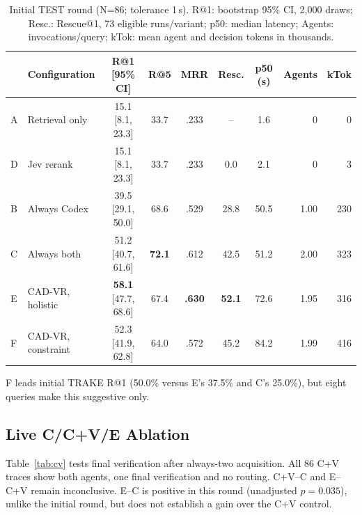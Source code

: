 \documentclass[runningheads]{llncs}
\begin{document}
\begin{table}[t]
\caption{Initial TEST round (N=86; tolerance 1\,s). R@1: bootstrap 95\% CI, 2,000 draws; Resc.: Rescue@1, 73 eligible runs/variant; p50: median latency; Agents: invocations/query; kTok: mean agent and decision tokens in thousands.}
\label{tab:main}
\centering
\setlength{\tabcolsep}{3.1pt}
\footnotesize
\begin{tabular}{@{}llcccccrr@{}}
\toprule
& Configuration & R@1 [95\% CI] & R@5 & MRR & Resc. & p50 (s) & Agents & kTok\\
\midrule
A & Retrieval only & 15.1 [8.1, 23.3] & 33.7 & .233 & -- & 1.6 & 0 & 0\\
D & Jev rerank & 15.1 [8.1, 23.3] & 33.7 & .233 & 0.0 & 2.1 & 0 & 3\\
B & Always Codex & 39.5 [29.1, 50.0] & 68.6 & .529 & 28.8 & 50.5 & 1.00 & 230\\
C & Always both & 51.2 [40.7, 61.6] & \textbf{72.1} & .612 & 42.5 & 51.2 & 2.00 & 323\\
\midrule
E & CAD-VR, holistic & \textbf{58.1} [47.7, 68.6] & 67.4 & \textbf{.630} & \textbf{52.1} & 72.6 & 1.95 & 316\\
F & CAD-VR, constraint & 52.3 [41.9, 62.8] & 64.0 & .572 & 45.2 & 84.2 & 1.99 & 416\\
\bottomrule
\end{tabular}
\end{table}


F leads initial TRAKE R@1 (50.0\% versus E's 37.5\% and C's 25.0\%), but eight queries make this suggestive only.

\subsection{Live C/C+V/E Ablation}
\label{sec:ablation}
Table~\ref{tab:cv} tests final verification after always-two acquisition. All 86 C+V traces show both agents, one final verification and no routing. C+V--C and E--C+V remain inconclusive. E--C is positive in this round (unadjusted $p=0.035$), unlike the initial round, but does not establish a gain over the C+V control.
\end{document}
